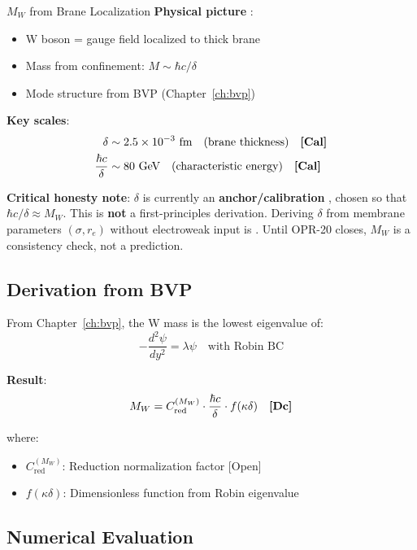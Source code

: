 \begin{mechanism}{$M_W$ from Brane Localization}
\textbf{Physical picture} \tagP{}:
\begin{itemize}[nosep]
\item W boson = gauge field localized to thick brane
\item Mass from confinement: $M \sim \hbar c / \delta$
\item Mode structure from BVP (Chapter~\ref{ch:bvp})
\end{itemize}

\textbf{Key scales}:
\begin{align}
\delta &\sim 2.5 \times 10^{-3} \text{ fm} \quad \text{(brane thickness)} \quad \textbf{[Cal]} \\
\frac{\hbar c}{\delta} &\sim 80 \text{ GeV} \quad \text{(characteristic energy)} \quad \textbf{[Cal]}
\end{align}

\textbf{Critical honesty note}: $\delta$ is currently an \textbf{anchor/calibration} \tagCal{},
chosen so that $\hbar c/\delta \approx M_W$. This is \textbf{not} a first-principles derivation.
Deriving $\delta$ from membrane parameters $(\sigma, r_e)$ without electroweak input is .
Until OPR-20 closes, $M_W$ is a consistency check, not a prediction.
\end{mechanism}

\subsection{Derivation from BVP}

From Chapter~\ref{ch:bvp}, the W mass is the lowest eigenvalue of:
\begin{equation}
-\frac{d^2\psi}{dy^2} = \lambda \psi \quad \text{with Robin BC}
\end{equation}

\textbf{Result}:
\begin{equation}
M_W = C_{\text{red}}^{(M_W)} \cdot \frac{\hbar c}{\delta} \cdot f(\kappa\delta) \quad \textbf{[Dc]}
\end{equation}

where:
\begin{itemize}[nosep]
\item $C_{\text{red}}^{(M_W)}$: Reduction normalization factor [Open]
\item $f(\kappa\delta)$: Dimensionless function from Robin eigenvalue
\end{itemize}

\subsection{Numerical Evaluation}

